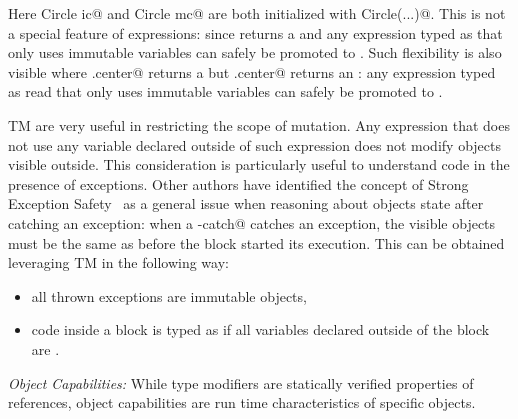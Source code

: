 Here \Q@imm Circle ic@ and \Q@mut Circle mc@ are both initialized with \Q@new Circle(...)@.
This is not a special feature of \Q@new@ expressions: since \Q@new@ returns a \Q@mut@ and any expression typed as \Q@mut@ that only uses immutable variables can safely be promoted to \Q@imm@.
Such flexibility is also visible where \Q@rc.center@ returns a \Q@read@ but \Q@ic.center@ returns an \Q@imm@: any expression typed as read that only
uses immutable variables can safely be promoted to \Q@imm@.






\loseSpace

TM are very useful in restricting the scope of mutation. 
Any expression that does not use any \Q@mut@ 
variable declared outside of such expression does not modify objects visible outside. This consideration is particularly useful to understand code in the presence of exceptions. Other authors have identified the concept of Strong Exception Safety~\cite{Abrahams2000} as a general issue when reasoning about objects state after catching an exception:
when a \Q@try-catch@ catches an exception, the visible objects must be the same as before the \Q@try@ block started its execution.
This can be obtained leveraging TM in the following way:
\begin{itemize}
\item all thrown exceptions are immutable objects,
\item code inside a \Q@try@ block is typed as if all \Q@mut@ variables declared outside of the block are \Q@read@.
\end{itemize}

\loseSpace
\noindent\textit{Object Capabilities:}
While type modifiers are statically verified properties of references, object capabilities are run time characteristics of specific objects.

